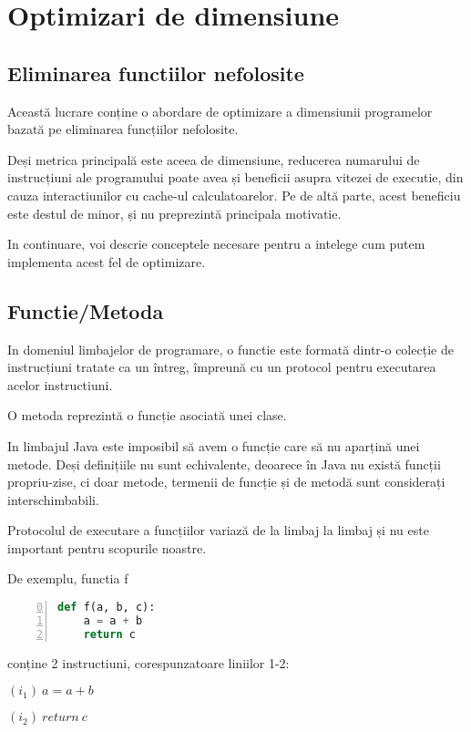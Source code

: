 \chapter{Optimizari de dimensiune}\label{capitolul_optimizari_de_dimensiune}

\section{Eliminarea functiilor nefolosite}

Această lucrare conține o abordare de optimizare a dimensiunii
programelor bazată pe eliminarea funcțiilor nefolosite.

Deși metrica principală este aceea de dimensiune, reducerea
numarului de instrucțiuni ale programului poate avea și beneficii
asupra vitezei de executie, din cauza interactiunilor cu cache-ul
calculatoarelor. Pe de altă parte, acest beneficiu este destul de
minor, și nu preprezintă principala motivatie.

In continuare, voi descrie conceptele necesare pentru a intelege
cum putem implementa acest fel de optimizare.

\section{Functie/Metoda}

In domeniul limbajelor de programare, o functie  este
formată dintr-o colecție de instrucțiuni tratate ca un întreg,
împreună cu un protocol pentru executarea acelor instructiuni.

O metoda  reprezintă o funcție asociată unei clase.

In limbajul Java este imposibil să avem o funcție care să nu
aparțină unei metode.
Deși definițiile nu sunt echivalente, deoarece în Java nu există
funcții propriu-zise, ci doar metode, termenii de funcție și de metodă
sunt considerați interschimbabili.

Protocolul de executare a funcțiilor variază de la limbaj la
limbaj și nu este important pentru scopurile noastre.

De exemplu, functia f
\begin{lstlisting}[language=Python, numbers=left, firstnumber=0]
def f(a, b, c):
    a = a + b
    return c
\end{lstlisting}
conține 2 instructiuni, corespunzatoare liniilor 1-2:

$(i_1)\ a = a + b$

$(i_2)\ return\ c$

